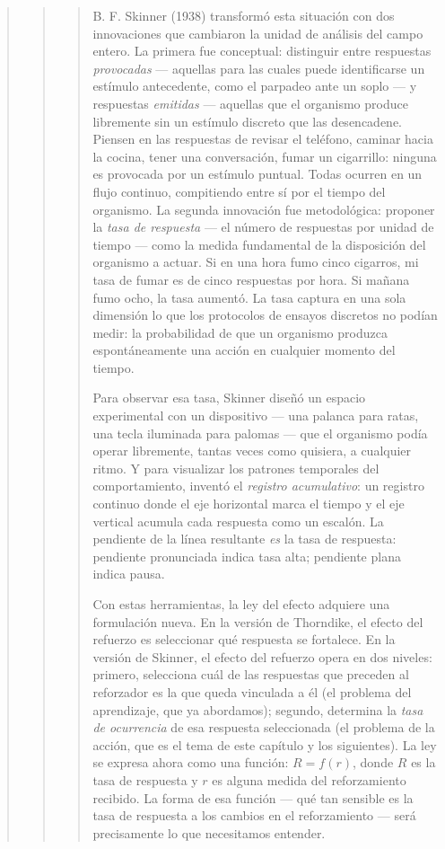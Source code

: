 \documentclass[
  letterpaper,
  DIV=11,
  numbers=noendperiod]{scrreprt}
\begin{document}
\begin{tcolorbox}[enhanced jigsaw, arc=.35mm, bottomrule=.15mm, breakable, colback=white, colframe=quarto-callout-note-color-frame, left=2mm, leftrule=.75mm, opacityback=0, rightrule=.15mm, toprule=.15mm]
\begin{quote}
\begin{quote}
\begin{quote}
B. F. Skinner (1938) transformó esta situación con dos innovaciones que
cambiaron la unidad de análisis del campo entero. La primera fue
conceptual: distinguir entre respuestas \emph{provocadas} --- aquellas
para las cuales puede identificarse un estímulo antecedente, como el
parpadeo ante un soplo --- y respuestas \emph{emitidas} --- aquellas que
el organismo produce libremente sin un estímulo discreto que las
desencadene. Piensen en las respuestas de revisar el teléfono, caminar
hacia la cocina, tener una conversación, fumar un cigarrillo: ninguna es
provocada por un estímulo puntual. Todas ocurren en un flujo continuo,
compitiendo entre sí por el tiempo del organismo. La segunda innovación
fue metodológica: proponer la \emph{tasa de respuesta} --- el número de
respuestas por unidad de tiempo --- como la medida fundamental de la
disposición del organismo a actuar. Si en una hora fumo cinco cigarros,
mi tasa de fumar es de cinco respuestas por hora. Si mañana fumo ocho,
la tasa aumentó. La tasa captura en una sola dimensión lo que los
protocolos de ensayos discretos no podían medir: la probabilidad de que
un organismo produzca espontáneamente una acción en cualquier momento
del tiempo.

Para observar esa tasa, Skinner diseñó un espacio experimental con un
dispositivo --- una palanca para ratas, una tecla iluminada para palomas
--- que el organismo podía operar libremente, tantas veces como
quisiera, a cualquier ritmo. Y para visualizar los patrones temporales
del comportamiento, inventó el \emph{registro acumulativo}: un registro
continuo donde el eje horizontal marca el tiempo y el eje vertical
acumula cada respuesta como un escalón. La pendiente de la línea
resultante \emph{es} la tasa de respuesta: pendiente pronunciada indica
tasa alta; pendiente plana indica pausa.

Con estas herramientas, la ley del efecto adquiere una formulación
nueva. En la versión de Thorndike, el efecto del refuerzo es seleccionar
qué respuesta se fortalece. En la versión de Skinner, el efecto del
refuerzo opera en dos niveles: primero, selecciona cuál de las
respuestas que preceden al reforzador es la que queda vinculada a él (el
problema del aprendizaje, que ya abordamos); segundo, determina la
\emph{tasa de ocurrencia} de esa respuesta seleccionada (el problema de
la acción, que es el tema de este capítulo y los siguientes). La ley se
expresa ahora como una función: \(R = f(r)\), donde \(R\) es la tasa de
respuesta y \(r\) es alguna medida del reforzamiento recibido. La forma
de esa función --- qué tan sensible es la tasa de respuesta a los
cambios en el reforzamiento --- será precisamente lo que necesitamos
entender.


\end{quote}
\end{quote}
\end{quote}
\end{tcolorbox}
\end{document}
